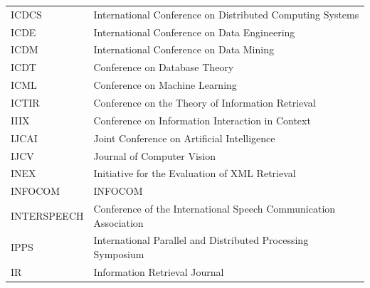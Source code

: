 \documentclass[msc]{ppgccufmg}
\begin{document}
\begin{appendices}
\begin{table}[h]
\begin{tabular}{ll}
ICDCS					&		International Conference on Distributed Computing Systems  \\ 
ICDE					&		International Conference on Data Engineering  \\ 
ICDM					&		International Conference on Data Mining  \\ 
ICDT					&		Conference on Database Theory  \\ 
ICML					&		Conference on Machine Learning  \\ 
ICTIR					&		Conference on the Theory of Information Retrieval  \\ 
IIIX					&		Conference on Information Interaction in Context  \\ 
IJCAI					&		Joint Conference on Artificial Intelligence  \\ 
IJCV					&		Journal of Computer Vision  \\ 
INEX					&		Initiative for the Evaluation of XML Retrieval  \\ 
INFOCOM					&		INFOCOM  \\ 
INTERSPEECH					&		Conference of the International Speech Communication Association  \\ 
IPPS					&		International Parallel and Distributed Processing Symposium  \\ 
IR					&		Information Retrieval Journal  \\ 
\bottomrule
\end{tabular}
\end{table}


\end{appendices}
\end{document}
